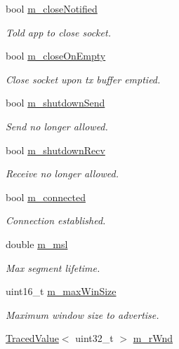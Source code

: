 \begin{DoxyCompactItemize}
bool \hyperlink{classns3_1_1TcpSocketBase_a8b9716e924553832a827b6efe214b70f}{m\+\_\+close\+Notified}
\begin{DoxyCompactList}\small\item\em Told app to close socket. \end{DoxyCompactList}\item 
bool \hyperlink{classns3_1_1TcpSocketBase_a46c12a1d96840292ae2b55c3c2974214}{m\+\_\+close\+On\+Empty}
\begin{DoxyCompactList}\small\item\em Close socket upon tx buffer emptied. \end{DoxyCompactList}\item 
bool \hyperlink{classns3_1_1TcpSocketBase_a443b4ee2b08a845f9429e150d1171a23}{m\+\_\+shutdown\+Send}
\begin{DoxyCompactList}\small\item\em Send no longer allowed. \end{DoxyCompactList}\item 
bool \hyperlink{classns3_1_1TcpSocketBase_a946e6fc03360915a21e089f9cd8cf279}{m\+\_\+shutdown\+Recv}
\begin{DoxyCompactList}\small\item\em Receive no longer allowed. \end{DoxyCompactList}\item 
bool \hyperlink{classns3_1_1TcpSocketBase_aa52df78102ea7c1c6b432ad9486ed0c2}{m\+\_\+connected}
\begin{DoxyCompactList}\small\item\em Connection established. \end{DoxyCompactList}\item 
double \hyperlink{classns3_1_1TcpSocketBase_a668a2cc5cf751511263ee8a0766c9ea5}{m\+\_\+msl}
\begin{DoxyCompactList}\small\item\em Max segment lifetime. \end{DoxyCompactList}\item 
uint16\+\_\+t \hyperlink{classns3_1_1TcpSocketBase_a045897aa710b2ad3e99cefd66e8dc168}{m\+\_\+max\+Win\+Size}
\begin{DoxyCompactList}\small\item\em Maximum window size to advertise. \end{DoxyCompactList}\item 
\hyperlink{classns3_1_1TracedValue}{Traced\+Value}$<$ uint32\+\_\+t $>$ \hyperlink{classns3_1_1TcpSocketBase_af3fafd1671964e0674677be541e1501a}{m\+\_\+r\+Wnd}

\end{DoxyCompactItemize}
